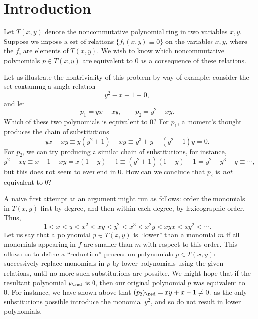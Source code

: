 \section{Introduction}\label{sec:introduction}

Let $T(x,y)$ denote the noncommutative polynomial ring in two variables $x,y$. Suppose we impose a set of relations $\{f_i(x,y)\equiv 0\}$ on the variables $x,y$, where the $f_i$ are elements of $T(x,y)$. We wish to know which noncommutative polynomials $p\in T(x,y)$ are equivalent to $0$ as a consequence of these relations.

Let us illustrate the nontriviality of this problem by way of example: consider the set containing a single relation
\begin{equation}
\label{eqn:relations}
y^2-x+1\equiv 0,
\end{equation}
and let
\begin{equation*}
p_1=yx-xy,\qquad p_2=y^2-xy.
\end{equation*}
Which of these two polynomials is equivalent to $0$? For $p_1$, a moment's thought produces the chain of substitutions
\begin{equation}
\label{eqn:p1}
yx-xy\equiv y(y^2+1)-xy\equiv y^3+y-(y^2+1)y=0.
\end{equation}
For $p_2$, we can try producing a similar chain of substitutions, for instance,
\begin{equation*}
y^2-xy\equiv x-1-xy=x(1-y)-1\equiv(y^2+1)(1-y)-1=y^2-y^3-y\equiv\cdots,
\end{equation*}
but this does not seem to ever end in $0$. How can we conclude that $p_2$ is \emph{not} equivalent to $0$?

A naive first attempt at an argument might run as follows: order the monomials in $T(x,y)$ first by degree, and then within each degree, by lexicographic order. Thus,
\begin{equation*}
1<x<y<x^2<xy<y^2<x^3<x^2y<xyx<xy^2<\cdots.
\end{equation*}
Let us say that a polynomial $p\in T(x,y)$ is ``lower'' than a monomial $m$ if all monomials appearing in $f$ are smaller than $m$ with respect to this order. This allows us to define a ``reduction'' process on polynomials $p\in T(x,y)$: successively replace monomials in $p$ by lower polynomials using the given relations, until no more such substitutions are possible. We might hope that if the resultant polynomial $p_\red$ is $0$, then our original polynomial $p$ was equivalent to $0$. For instance, we have shown above that $(p_2)_\red=xy+x-1\ne 0$, as the only substitutions possible introduce the monomial $y^2$, and so do not result in lower polynomials.

